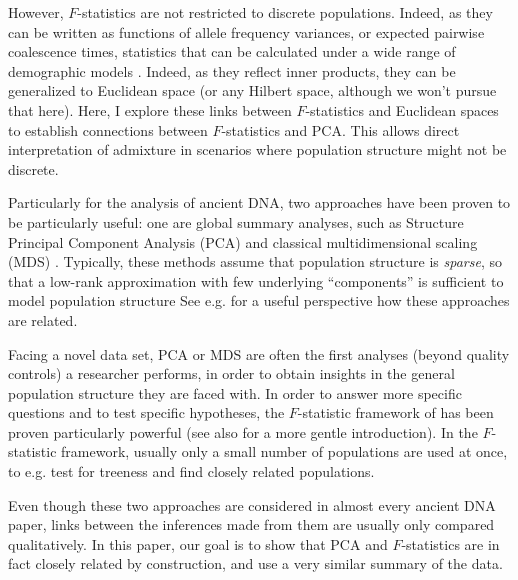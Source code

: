 \documentclass[12pt,a4pape, fullpage]{article}
\begin{document}
However, $F$-statistics are not restricted to discrete populations. Indeed, as they can be written as functions of allele frequency variances, or expected pairwise coalescence times, statistics that can be calculated under a wide range of demographic models \cite{peter2016}. Indeed, as they reflect inner products, they can be generalized to Euclidean space \cite{oteo2021} (or any Hilbert space, although we won't pursue that here).
Here, I explore these links between $F$-statistics and Euclidean spaces to establish connections between $F$-statistics and PCA. This allows direct interpretation of admixture in scenarios where population structure might not be discrete.




Particularly for the analysis of ancient DNA, two approaches have been proven to be particularly useful: one are global summary analyses, such as Structure \citep{pritchard2000, alexander2009} Principal Component Analysis (PCA) \citep{cavalli-sforza1994, reich2008, novembre2008, mcvean2009} and classical multidimensional scaling (MDS) \cite{fu2016, malaspinas_bammds}. Typically, these methods assume that population structure is \emph{sparse}, so that a low-rank approximation with few underlying ``components'' is sufficient to model population structure See e.g. \cite{engelhardt2010} for a useful perspective how these approaches are related.

Facing a novel data set, PCA or MDS are often the first analyses (beyond quality controls) a researcher performs, in order to obtain insights in the general population structure they are faced with. In order to answer more specific questions and to test specific hypotheses, the $F$-statistic framework of \cite{patterson2012} has been proven particularly powerful (see also \cite{peter2016} for a more gentle introduction). In the $F$-statistic framework, usually only a small number of populations are used at once, to e.g. test for treeness and find closely related populations.

Even though these two approaches are considered in almost every ancient DNA paper, links between the inferences made from them are usually only compared qualitatively. In this paper, our goal is to show that PCA and $F$-statistics are in fact closely related by construction, and use a very similar summary of the data. 
\end{document}
